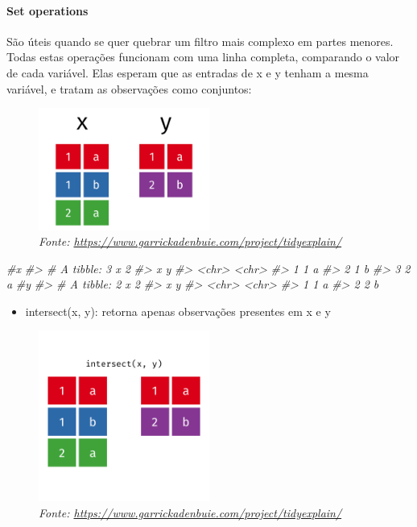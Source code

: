 \documentclass[
]{article}
\newenvironment{Shaded}{\begin{snugshade}}{\end{snugshade}}
\newcommand{\CommentTok}[1]{\textcolor[rgb]{0.56,0.35,0.01}{\textit{#1}}}
\begin{document}
\hypertarget{set-operations}{%
\paragraph{Set operations}\label{set-operations}}

São úteis quando se quer quebrar um filtro mais complexo em partes
menores. Todas estas operações funcionam com uma linha completa,
comparando o valor de cada variável. Elas esperam que as entradas de x e
y tenham a mesma variável, e tratam as observações como conjuntos:

\begin{figure}
\centering
\includegraphics[width=0.5\textwidth,height=\textheight]{original-dfs-set-ops.png}
\caption{\emph{Fonte:
\url{https://www.garrickadenbuie.com/project/tidyexplain/}}}
\end{figure}

\begin{Shaded}
\begin{Highlighting}[]
\CommentTok{#x}
\CommentTok{#> # A tibble: 3 x 2}
\CommentTok{#>   x     y    }
\CommentTok{#>   <chr> <chr>}
\CommentTok{#> 1 1     a    }
\CommentTok{#> 2 1     b    }
\CommentTok{#> 3 2     a}
\CommentTok{#y }
\CommentTok{#> # A tibble: 2 x 2}
\CommentTok{#>   x     y    }
\CommentTok{#>   <chr> <chr>}
\CommentTok{#> 1 1     a    }
\CommentTok{#> 2 2     b}
\end{Highlighting}
\end{Shaded}

\begin{itemize}
\item
  intersect(x, y): retorna apenas observações presentes em x e y
\end{itemize}

\begin{figure}
\centering
\includegraphics[width=0.5\textwidth,height=\textheight]{intersect.gif}
\caption{\emph{Fonte:
\url{https://www.garrickadenbuie.com/project/tidyexplain/}}}
\end{figure}
\end{document}
